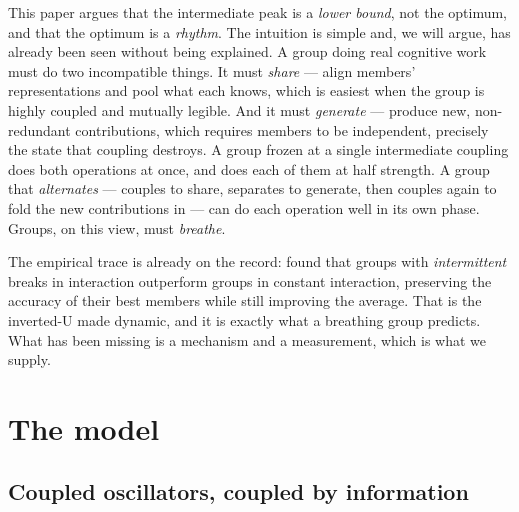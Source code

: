 \documentclass[11pt]{article}
\begin{document}
This paper argues that the intermediate peak is a \emph{lower bound}, not the optimum, and that the optimum is a \emph{rhythm}. The intuition is simple and, we will argue, has already been seen without being explained. A group doing real cognitive work must do two incompatible things. It must \emph{share} --- align members' representations and pool what each knows, which is easiest when the group is highly coupled and mutually legible. And it must \emph{generate} --- produce new, non-redundant contributions, which requires members to be independent, precisely the state that coupling destroys. A group frozen at a single intermediate coupling does both operations at once, and does each of them at half strength. A group that \emph{alternates} --- couples to share, separates to generate, then couples again to fold the new contributions in --- can do each operation well in its own phase. Groups, on this view, must \emph{breathe}.

The empirical trace is already on the record: \citet{bernstein2018intermittent} found that groups with \emph{intermittent} breaks in interaction outperform groups in constant interaction, preserving the accuracy of their best members while still improving the average. That is the inverted-U made dynamic, and it is exactly what a breathing group predicts. What has been missing is a mechanism and a measurement, which is what we supply.

\section{The model}

\subsection{Coupled oscillators, coupled by information}
\end{document}

